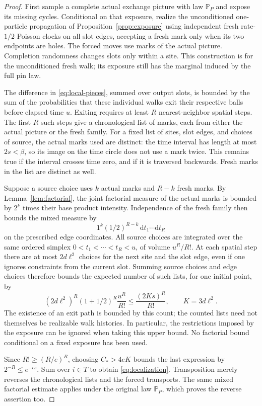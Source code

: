 \begin{proof}
First sample a complete actual exchange picture with law
$\mathbb P_P$ and expose its missing cycles.  Conditional on that
exposure, realize the unconditioned one-particle propagation of
Proposition~\ref{prop:exposure} using independent fresh rate-$1/2$
Poisson clocks on all slot edges, accepting a fresh mark only when its
two endpoints are holes.  The forced moves use marks of the actual
picture.  Completion randomness changes slots only within a site.
This construction is for the unconditioned fresh walk; its exposure
still has the marginal induced by the full pin law.

The difference in \eqref{eq:local-pieces}, summed over output slots, is
bounded by the sum of the probabilities that these individual walks
exit their respective balls before elapsed time $u$.  Exiting requires
at least $R$ nearest-neighbor spatial steps.  The first $R$ such steps
give a chronological list of marks, each from either the actual
picture or the fresh family.  For a fixed list of sites, slot edges,
and choices of source, the actual marks used are distinct: the time
interval has length at most $2s<\beta$, so its image on the time circle
does not use a mark twice.  This remains true if the interval crosses
time zero, and if it is traversed backwards.  Fresh marks in the list
are distinct as well.

Suppose a source choice uses $k$ actual marks and $R-k$ fresh marks.
By Lemma~\ref{lem:factorial}, the joint factorial measure of the
actual marks is bounded by $2^k$ times their base product intensity.
Independence of the fresh family then bounds the mixed measure by
\[
        1^k(1/2)^{R-k}\,\mathrm dt_1\cdots\mathrm dt_R
\]
on the prescribed edge coordinates.  All source choices are integrated
over the same ordered simplex
$0<t_1<\cdots<t_R<u$, of volume $u^R/R!$.
At each spatial step there are at most $2d\ell^2$ choices for the next
site and the slot edge, even if one ignores constraints from the
current slot.  Summing source choices and edge choices therefore bounds
the expected number of such lists, for one initial point, by
\begin{equation}\label{eq:mixed-factorial-count}
 (2d\ell^2)^R(1+1/2)^R\frac{u^R}{R!}
       \le\frac{(2Ks)^R}{R!},\qquad K=3d\ell^2.
\end{equation}
The existence of an exit path is bounded by this count; the counted
lists need not themselves be realizable walk histories.  In
particular, the restrictions imposed by the exposure can be ignored
when taking this upper bound.  No factorial bound conditional on a
fixed exposure has been used.

Since $R!\ge(R/e)^R$, choosing $C_*>4eK$ bounds the last expression
by $2^{-R}\le e^{-cs}$.  Sum over $i\in T$ to obtain
\eqref{eq:localization}.  Transposition merely reverses the
chronological lists and the forced transports.  The same mixed
factorial estimate applies under the original law $\mathbb P_P$,
which proves the reverse assertion too.
\end{proof}

